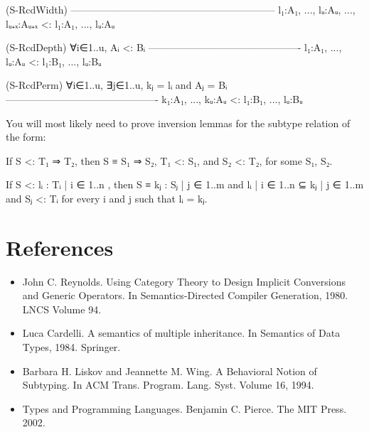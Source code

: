 \begin{myDisplay}
(S-RcdWidth)
--------------------------------------------------------------
{ l₁:A₁, ..., lᵤ:Aᵤ, ..., lᵤ₊ₓ:Aᵤ₊ₓ } <: { l₁:A₁, ..., lᵤ:Aᵤ }

(S-RcdDepth)
    ∀i∈1..u, Aᵢ <: Bᵢ
----------------------------------------------
{ l₁:A₁, ..., lᵤ:Aᵤ } <: { l₁:B₁, ..., lᵤ:Bᵤ }

(S-RcdPerm)
∀i∈1..u, ∃j∈1..u, kⱼ = lᵢ and Aⱼ = Bᵢ
----------------------------------------------
{ k₁:A₁, ..., kᵤ:Aᵤ } <: { l₁:B₁, ..., lᵤ:Bᵤ }
\end{myDisplay}

You will most likely need to prove inversion lemmas for the subtype
relation of the form:

\begin{myDisplay}
If S <: T₁ ⇒ T₂, then S ≡ S₁ ⇒ S₂, T₁ <: S₁, and S₂ <: T₂, for some S₁, S₂.

If S <: { lᵢ : Tᵢ | i ∈ 1..n }, then S ≡ { kⱼ : Sⱼ | j ∈ 1..m }
and { lᵢ | i ∈ 1..n } ⊆ { kⱼ | j ∈ 1..m }
and Sⱼ <: Tᵢ for every i and j such that lᵢ = kⱼ.
\end{myDisplay}

\hypertarget{references}{%
\section{References}\label{references}}

\begin{itemize}
\item
  John C. Reynolds. Using Category Theory to Design Implicit Conversions
  and Generic Operators. In Semantics-Directed Compiler Generation,
  1980. LNCS Volume 94.
\item
  Luca Cardelli. A semantics of multiple inheritance. In Semantics of
  Data Types, 1984. Springer.
\item
  Barbara H. Liskov and Jeannette M. Wing. A Behavioral Notion of
  Subtyping. In ACM Trans. Program. Lang. Syst. Volume 16, 1994.
\item
  Types and Programming Languages. Benjamin C. Pierce. The MIT Press.
  2002.
\end{itemize}

